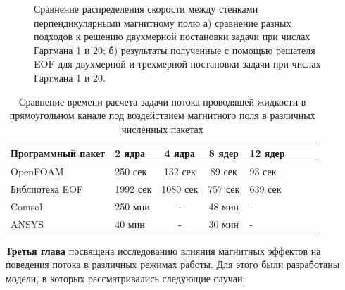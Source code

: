 \begin{figure}[h!]
	\caption{Сравнение распределения скорости между стенками перпендикулярными магнитному полю а) сравнение разных подходов к решению двухмерной постановки задачи при числах Гартмана 1 и 20; б) результаты полученные с помощью решателя EOF для двухмерной и трехмерной постановки задачи при числах Гартмана 1 и 20.}
	\label{fig:comparision}
	
\end{figure}

\begin{table}
	\centering
	\captionsetup{justification=centering}
	\caption{Сравнение времени расчета задачи потока проводящей жидкости в прямоугольном канале под воздействием магнитного поля в различных численных пакетах}
	\begin{tabular}{llccllcc}
		\toprule	
			Программный пакет & 2 ядра        & 4 ядра       & 8  ядер    & 12   ядер  \\
			\midrule
			OpenFOAM                       & 250 сек  & 132 сек  & 89 сек  & 93 сек  \\ \hline
			Библиотека EOF                 & 1992 сек & 1080 сек & 757 сек & 639 сек \\ \hline
			Comsol                         & 250  мни & -        & 48 мин  & -       \\ \hline
			ANSYS                          & 40 мин   & -        & 30 мин  & -       \\ \hline
	\end{tabular}
\label{tab:comparision}
\end{table}



\underline{\textbf{Третья глава}} посвящена исследованию влияния магнитных эффектов на поведения потока в различных режимах работы. Для этого были разработаны модели, в которых рассматривались следующие случаи:


